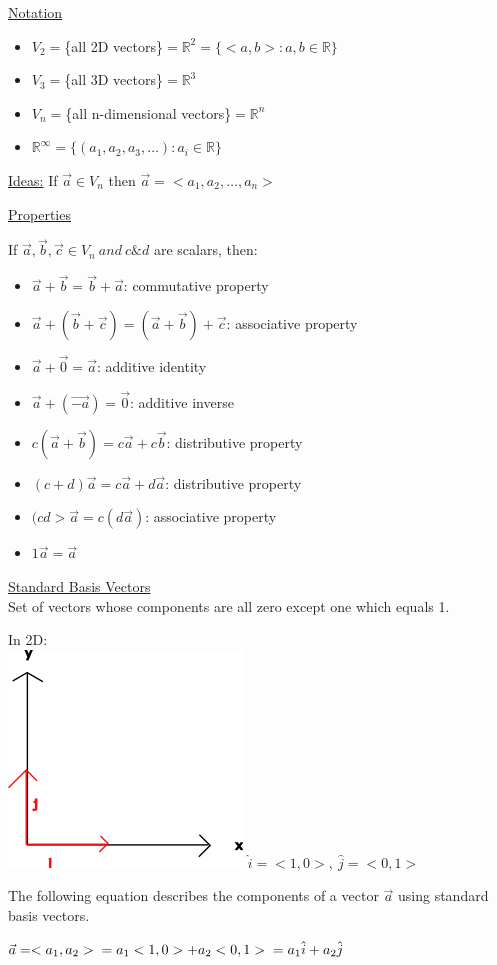 \documentclass[10pt]{article}
\begin{document}
\underline{Notation}
\begin{itemize}
	\item $V_2=$\{all 2D vectors\}$=\mathbb{R}^2=\{<a,b>:a,b\in\mathbb{R}\}$
	\item $V_3=$\{all 3D vectors\}$=\mathbb{R}^3$
	\item $V_n=$\{all n-dimensional vectors\}$=\mathbb{R}^n$
	\item $\mathbb{R}^\infty=\{(a_1,a_2,a_3,\hdots):a_i\in\mathbb{R}\}$
\end{itemize}

\underline{Ideas:} If $\vec{a} \in V_n $ then $\vec{a}  = <a_1,a_2,\hdots,a_n> $

\underline{Properties}

If $\vec{a} , \vec{b} , \vec{c} \in V_n\ and\ c\&d   $ are scalars, then:
\begin{itemize}
	\item $\vec{a} + \vec{b}  = \vec{b}  + \vec{a}     $: commutative property
	\item $\vec{a} +(\vec{b} +\vec{c} )=(\vec{a} +\vec{b} )+\vec{c}       $: associative property
	\item $\vec{a} +\vec{0} =\vec{a}    $: additive identity
	\item $\vec{a} +(\vec{-a} )=\vec{0}    $: additive inverse 
	\item $c(\vec{a} +\vec{b} )=c \vec{a} + c \vec{b}     $: distributive property
	\item $(c+d)\vec{a} =c \vec{a}  + d \vec{a}    $: distributive property
	\item $(cd>\vec{a} =c(d \vec{a} )  $: associative property
	\item $1 \vec{a} =\vec{a}   $
\end{itemize}

\underline{Standard Basis Vectors}\\Set of vectors whose components are all zero except one which equals 1.

In 2D:\\\includegraphics{standardbasisvectors} $\hat{i}=<1,0>,\ \hat{j}=<0,1>$

The following equation describes the components of a vector $\vec{a}  $ using standard basis vectors.

$\vec{a} =<a_1,a_2>\\=a_1<1,0>+a_2<0,1>\\=a_1\hat{i}+a_2\hat{j} $
\end{document}
